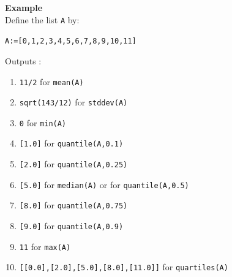 \documentclass[a4paper,11pt]{book}
\begin{document}
{\bf Example}\\
Define the list {\tt A} by:
\begin{center}
{\tt A:=[0,1,2,3,4,5,6,7,8,9,10,11]}
\end{center}
Outputs :
\begin{enumerate}
\item {\tt 11/2} for {\tt mean(A)}
\item
{\tt sqrt(143/12)} for {\tt stddev(A)}
\item
{\tt 0} for {\tt min(A)}
\item
{\tt [1.0]} for {\tt quantile(A,0.1)}
\item
{\tt [2.0]} for {\tt quantile(A,0.25)}
\item
{\tt [5.0]} for {\tt median(A)} or for {\tt quantile(A,0.5)}
\item
{\tt [8.0]} for {\tt quantile(A,0.75)}
\item
{\tt [9.0]} for {\tt quantile(A,0.9)}
\item
{\tt 11} for {\tt max(A)}
\item
{\tt [[0.0],[2.0],[5.0],[8.0],[11.0]]} for {\tt quartiles(A)}
\end{enumerate}
\end{document}
